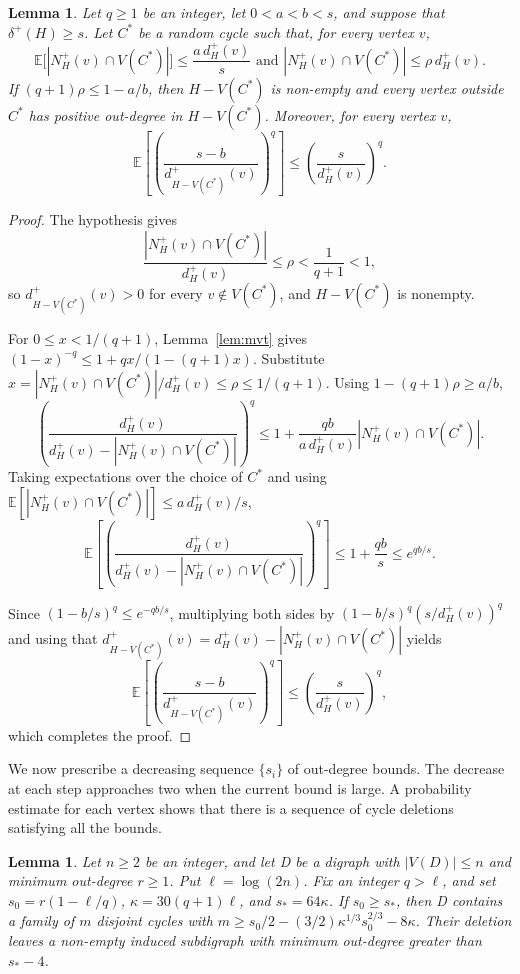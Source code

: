 \documentclass[a4paper,12pt]{article}
\newtheorem{lemma}[theorem]{Lemma}
\numberwithin{equation}{section}
\begin{document}
\begin{lemma}\label{lem:deletion}
Let $q\ge1$ be an integer, let $0<a<b<s$, and suppose that
$\delta^+(H)\ge s$. Let $C^\ast$ be a random cycle such that, for every
vertex $v$,
$$
\mathbb E\bigl[|N_H^+(v)\cap V(C^\ast)|\bigr]\le\frac{a\,d_H^+(v)}{s} \mbox{ and } 
|N_H^+(v)\cap V(C^\ast)|\le\rho\,d_H^+(v).
$$  If $(q+1)\rho\le1-a/b$, then $H-V(C^\ast)$ is non-empty and
every vertex outside $C^\ast$ has positive out-degree in
$H-V(C^\ast)$. Moreover, for every vertex $v$,
$$
\mathbb E\left[
\left(\frac{s-b}{d_{H-V(C^\ast)}^+(v)}\right)^q
\right]
\le\left(\frac{s}{d_H^+(v)}\right)^q.
$$
\end{lemma}


\begin{proof}
The hypothesis gives
$$
\frac{|N_H^+(v)\cap V(C^\ast)|}{d_H^+(v)}\le\rho<\frac1{q+1}<1,
$$
so $d_{H-V(C^\ast)}^+(v)>0$ for every $v\notin V(C^\ast)$, and
$H-V(C^\ast)$ is nonempty.

For $0\le x<1/(q+1)$, Lemma~\ref{lem:mvt} gives
$(1-x)^{-q}\le1+qx/(1-(q+1)x)$. Substitute $x=|N_H^+(v)\cap V(C^\ast)|/d_H^+(v)\le\rho\leq 1/(q+1)$. Using
$1-(q+1)\rho\ge a/b$,
$$
\left(\frac{d_H^+(v)}{d_H^+(v)-|N_H^+(v)\cap V(C^\ast)|}\right)^q
\le1+\frac{qb}{a\,d_H^+(v)}|N_H^+(v)\cap V(C^\ast)|.
$$
Taking expectations over the choice of $C^\ast$ and using
$\mathbb E[|N_H^+(v)\cap V(C^\ast)|]\le a\,d_H^+(v)/s$,
$$
\mathbb E\left[
\left(\frac{d_H^+(v)}{d_H^+(v)-|N_H^+(v)\cap V(C^\ast)|}\right)^q
\right]
\le1+\frac{qb}{s}\le e^{qb/s}.
$$

Since $(1-b/s)^q\le e^{-qb/s}$, multiplying both sides by
$(1-b/s)^q(s/d_H^+(v))^q$ and using that $d_{H-V(C^\ast)}^+(v)=d_H^+(v)-|N_H^+(v)\cap V(C^\ast)|$ yields  
$$
\mathbb E\left[
\left(\frac{s-b}{d_{H-V(C^\ast)}^+(v)}\right)^q
\right]
\le\left(\frac{s}{d_H^+(v)}\right)^q,
$$
which completes the proof.
\end{proof}





We now prescribe a decreasing sequence $\{s_i\}$ of out-degree bounds.
The decrease at each step approaches two when the current bound
is large. A probability estimate for each vertex shows that there
is a sequence of cycle deletions satisfying all the bounds.


\begin{lemma}\label{lem:sequence}
Let $n\ge2$ be an integer, and let D be a digraph with
$|V(D)|\le n$ and minimum out-degree $r\ge1$.
Put $\ell=\log(2n)$.
Fix an integer $q>\ell$, and set
$s_0=r(1-\ell/q)$, $\kappa=30(q+1)\ell$, and $s_\ast=64\kappa$.
If $s_0\ge s_\ast$, then D contains a family of $m$
disjoint cycles with
$m\ge s_0/2-(3/2)\kappa^{1/3}s_0^{2/3}-8\kappa$.
Their deletion leaves a non-empty induced subdigraph with minimum
out-degree greater than $s_\ast-4$.
\end{lemma}
\end{document}
